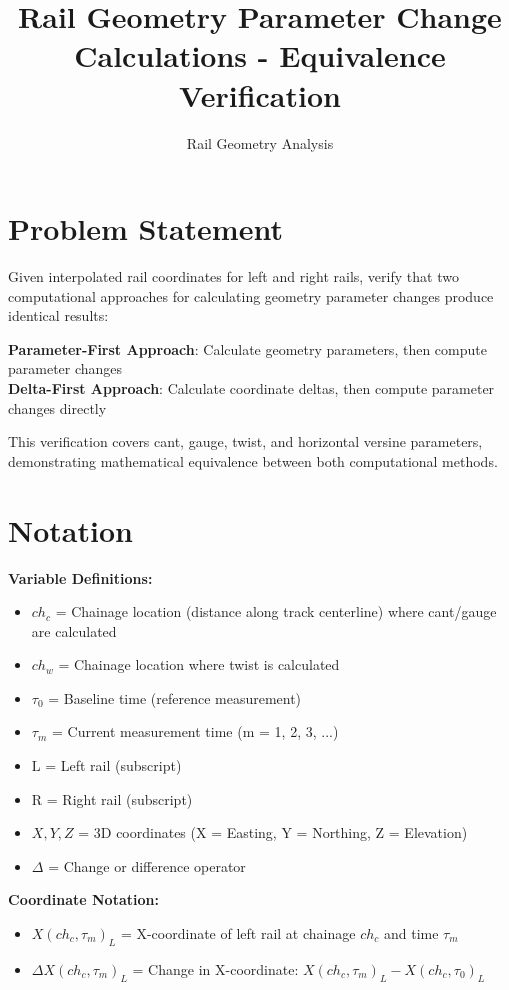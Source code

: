 \documentclass{article}
\title{Rail Geometry Parameter Change Calculations - Equivalence Verification}
\author{Rail Geometry Analysis}
\date{}
\begin{document}
\maketitle

\section{Problem Statement}
Given interpolated rail coordinates for left and right rails, verify that two computational approaches for calculating geometry parameter changes produce identical results:

\textbf{Parameter-First Approach}: Calculate geometry parameters, then compute parameter changes\\
\textbf{Delta-First Approach}: Calculate coordinate deltas, then compute parameter changes directly

This verification covers cant, gauge, twist, and horizontal versine parameters, demonstrating mathematical equivalence between both computational methods.

\section{Notation}
\textbf{Variable Definitions:}
\begin{itemize}
\item $ch_c$ = Chainage location (distance along track centerline) where cant/gauge are calculated
\item $ch_w$ = Chainage location where twist is calculated
\item $\tau_0$ = Baseline time (reference measurement)
\item $\tau_m$ = Current measurement time (m = 1, 2, 3, ...)
\item $\text{L}$ = Left rail (subscript)
\item $\text{R}$ = Right rail (subscript)
\item $X, Y, Z$ = 3D coordinates (X = Easting, Y = Northing, Z = Elevation)
\item $\Delta$ = Change or difference operator
\end{itemize}

\textbf{Coordinate Notation:}
\begin{itemize}
\item $X(ch_c, \tau_m)_L$ = X-coordinate of left rail at chainage $ch_c$ and time $\tau_m$
\item $\Delta X(ch_c, \tau_m)_L$ = Change in X-coordinate: $X(ch_c, \tau_m)_L - X(ch_c, \tau_0)_L$
\end{itemize}
\end{document}

